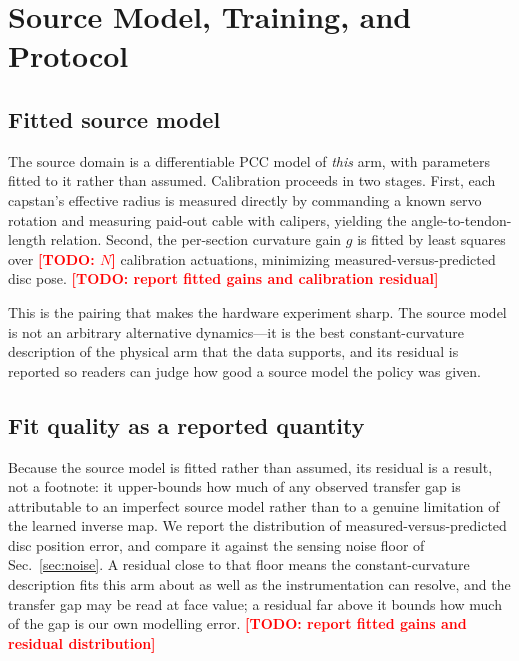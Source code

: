 \documentclass[letterpaper, 10pt, conference]{ieeeconf}
\newcommand{\todo}[1]{\textcolor{red}{\textbf{[TODO: #1]}}}
\begin{document}
\section{Source Model, Training, and Protocol}
\label{sec:protocol}

\subsection{Fitted source model}
\label{sec:calib}

The source domain is a differentiable PCC model of \emph{this} arm, with
parameters fitted to it rather than assumed. Calibration proceeds in two
stages. First, each capstan's effective radius is measured directly by
commanding a known servo rotation and measuring paid-out cable with calipers,
yielding the angle-to-tendon-length relation. Second, the per-section
curvature gain $g$ is fitted by least squares over \todo{$N$} calibration
actuations, minimizing measured-versus-predicted disc pose.
\todo{report fitted gains and calibration residual}

This is the pairing that makes the hardware experiment sharp. The source
model is not an arbitrary alternative dynamics---it is the best
constant-curvature description of the physical arm that the data supports,
and its residual is reported so readers can judge how good a source model the
policy was given.

\subsection{Fit quality as a reported quantity}

Because the source model is fitted rather than assumed, its residual is a
result, not a footnote: it upper-bounds how much of any observed transfer gap
is attributable to an imperfect source model rather than to a genuine
limitation of the learned inverse map. We report the distribution of
measured-versus-predicted disc position error, and compare it against the
sensing noise floor of Sec.~\ref{sec:noise}. A residual close to that floor
means the constant-curvature description fits this arm about as well as the
instrumentation can resolve, and the transfer gap may be read at face value; a
residual far above it bounds how much of the gap is our own modelling error.
\todo{report fitted gains and residual distribution}
\end{document}
